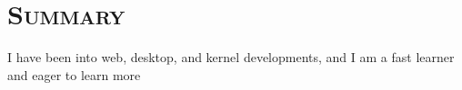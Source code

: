 \vspace*{-3em}
\section{\textsc{Summary}}

I have been into web, desktop, and kernel developments, and I am a fast learner and eager to learn more

